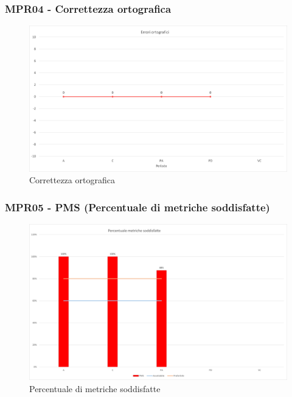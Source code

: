 \subsubsection{MPR04 - Correttezza ortografica}
\begin{figure}[!ht]
    \caption{Correttezza ortografica}
    \vspace{10px}
    \includegraphics[scale=0.5]{sezioni/immagini/CorrettezzaOrtografica.png}
    \centering
\end{figure}
\subsubsection{MPR05 - PMS (Percentuale di metriche soddisfatte)}
\begin{figure}[!ht]
    \caption{Percentuale di metriche soddisfatte}
    \vspace{10px}
    \includegraphics[scale=0.5]{sezioni/immagini/MetricheSoddisfatte.png}
    \centering
\end{figure}
\newpage
